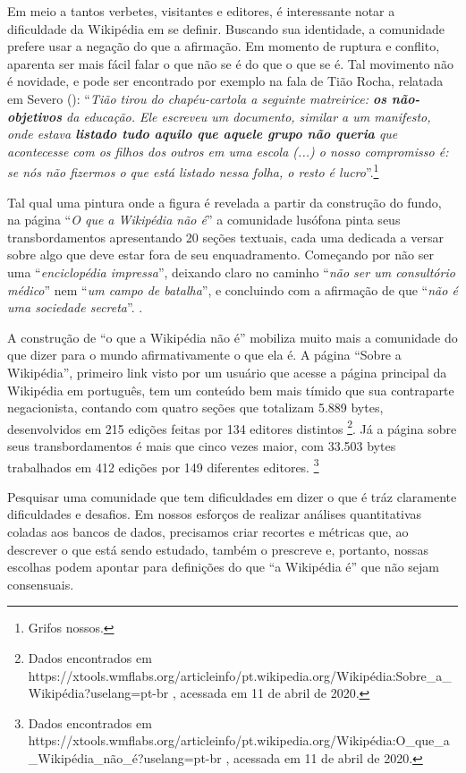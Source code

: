 Em meio a tantos verbetes, visitantes e editores, é interessante notar a dificuldade da Wikipédia em se definir. Buscando sua identidade, a comunidade prefere usar a negação do que a afirmação. Em momento de ruptura e conflito, aparenta ser mais fácil falar o que não se é do que o que se é. Tal movimento não é novidade, e pode ser encontrado por exemplo na fala de Tião Rocha, relatada em Severo (\citeyear[p. 19-20]{severo_tics_2016}): ``\textit{Tião tirou do chapéu-cartola a seguinte matreirice: \textbf{os não-objetivos} da educação. Ele escreveu um documento, similar a um manifesto, onde estava \textbf{listado tudo aquilo que aquele grupo não queria} que acontecesse com os filhos dos outros em uma escola (...) o nosso compromisso é: se nós não fizermos o que está listado nessa folha, o resto é lucro}''.\footnote{Grifos nossos.}

Tal qual uma pintura onde a figura é revelada a partir da construção do fundo, na página ``\textit{O que a Wikipédia não é}'' a comunidade lusófona pinta seus transbordamentos apresentando 20 seções textuais, cada uma dedicada a versar sobre algo que deve estar fora de seu enquadramento. Começando por não ser uma ``\textit{enciclopédia impressa}'', deixando claro no caminho ``\textit{não ser um consultório médico}'' nem ``\textit{um campo de batalha}'', e concluindo com a afirmação de que ``\textit{não é uma sociedade secreta}''. .

A construção de ``o que a Wikipédia não é'' mobiliza muito mais a comunidade do que dizer para o mundo afirmativamente o que ela é. A página “Sobre a Wikipédia”, primeiro link visto por um usuário que acesse a página principal da Wikipédia em português, tem um conteúdo bem mais tímido que sua contraparte negacionista,  contando com quatro seções que totalizam 5.889 bytes, desenvolvidos em 215 edições feitas por 134 editores distintos 
\footnote{Dados encontrados em https://xtools.wmflabs.org/articleinfo/pt.wikipedia.org/Wikipédia:Sobre\_a\_Wikipédia?uselang=pt-br , acessada em 11 de abril de 2020.}. Já a página sobre seus transbordamentos é mais que cinco vezes maior, com 33.503 bytes trabalhados em 412 edições por 149 diferentes editores. 
\footnote{Dados encontrados em https://xtools.wmflabs.org/articleinfo/pt.wikipedia.org/Wikipédia:O\_que\_a\_Wikipédia\_não\_é?uselang=pt-br , acessada em 11 de abril de 2020.} 

Pesquisar uma comunidade que tem dificuldades em dizer o que é tráz claramente dificuldades e desafios. Em nossos esforços de realizar análises quantitativas coladas aos bancos de dados, precisamos criar recortes e métricas que, ao descrever o que está sendo estudado, também o prescreve e, portanto, nossas escolhas podem apontar para definições do que ``a Wikipédia é'' que não sejam consensuais.

